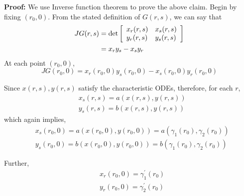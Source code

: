 \documentclass[11pt, a4paper]{report}
\begin{document}
{\bfseries Proof:} We use Inverse function theorem to prove the above claim. Begin by fixing $(r_0, 0)$. From
the stated definition of $G(r,s)$, we can say that 
\begin{equation*}
    \begin{split}
        JG(r,s) & = \operatorname{det} \left[\begin{array}{ l l }{x_{r}(r,s)} & {x_{s}(r, s)} \\ 
        {y_{r}(r, s)} & {y_{s}(r, s)}\end{array}\right] \\
        & = x_{r}y_{s} - x_{s}y_{r}
    \end{split}
\end{equation*}
At each point $(r_0, 0)$, 
\begin{equation*}
    JG(r_0, 0) = x_{r}(r_0, 0)y_{s}(r_0, 0) - x_{s}(r_0, 0)y_{r}(r_0, 0)
\end{equation*}

Since $x(r,s), y(r,s)$ satisfy the characteristic ODEs, therefore, for each $r$,
\begin{equation*}
    \begin{aligned}
        & x_{s}(r, s) = a(x(r, s), y(r, s)) \\[-0.5em]
        & y_{s}(r, s) = b(x(r, s), y(r, s))
    \end{aligned}
\end{equation*}
which again implies,
\begin{equation*}
    \begin{aligned}
        & x_{s}(r_0, 0) = a(x(r_0, 0), y(r_0, 0)) = a(\gamma_1(r_0), \gamma_2(r_0)) \\[-0.5em]
        & y_{s}(r_0, 0) = b(x(r_0, 0), y(r_0, 0)) = b(\gamma_1(r_0), \gamma_2(r_0)) 
    \end{aligned}
\end{equation*}

Further,
\begin{equation*}
    \begin{aligned}
        & x_{r}\left(r_{0}, 0\right) = \gamma_{1}^{\prime}\left(r_{0}\right) \\[-0.5em]
        & y_{r}\left(r_{0}, 0\right) = \gamma_{2}^{\prime}\left(r_{0}\right) 
    \end{aligned}
\end{equation*}
\end{document}

